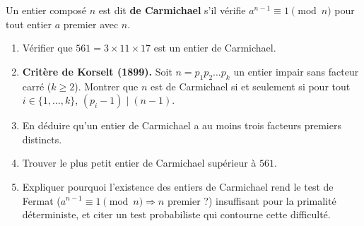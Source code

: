 \documentclass[11pt]{article}
\begin{document}
\begin{exercice}
Un entier composé $n$ est dit \textbf{de Carmichael} s'il vérifie $a^{n-1} \equiv 1 \pmod n$ pour tout entier $a$ premier avec $n$.
\begin{enumerate}
    \item Vérifier que $561 = 3 \times 11 \times 17$ est un entier de Carmichael.
    \item \textbf{Critère de Korselt (1899).} Soit $n = p_1 p_2 \dots p_k$ un entier impair sans facteur carré ($k \ge 2$). Montrer que $n$ est de Carmichael si et seulement si pour tout $i \in \{1,\dots,k\}$, $(p_i - 1) \mid (n - 1)$.
    \item En déduire qu'un entier de Carmichael a au moins trois facteurs premiers distincts.
    \item Trouver le plus petit entier de Carmichael supérieur à $561$.
    \item Expliquer pourquoi l'existence des entiers de Carmichael rend le test de Fermat ($a^{n-1} \equiv 1 \pmod n \Rightarrow n$ premier ?) insuffisant pour la primalité déterministe, et citer un test probabiliste qui contourne cette difficulté.
\end{enumerate}
\end{exercice}
\end{document}
